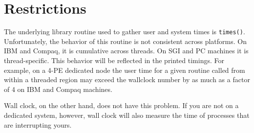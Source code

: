 \section{Restrictions}

The underlying library routine used to gather user and system times is
{\tt times()}.  Unfortunately, the behavior of this routine is not consistent
across platforms.  On IBM and Compaq, it is cumulative across threads.  On
SGI and PC machines it is thread-specific.  This behavior will be reflected
in the printed timings.  For example, on a 4-PE dedicated node the user time
for a given routine called from within a threaded region may exceed the
wallclock number by as much as a factor of 4 on IBM and Compaq machines.

Wall clock, on the other hand, does not have this problem.  If you are not on a
dedicated system, however, wall clock will also measure the time of processes
that are interrupting yours.
